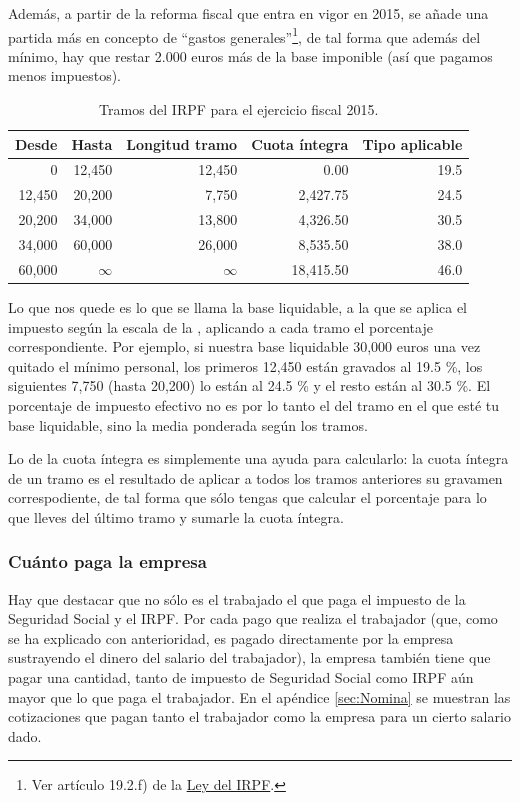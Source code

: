 \documentclass[nochap,palatino,shortheader]{apuntes}
\begin{document}
Además, a partir de la reforma fiscal que entra en vigor en 2015, se añade una partida más en concepto de ``gastos generales''\footnote{Ver artículo 19.2.f) de la \href{https://www.boe.es/buscar/act.php?id=BOE-A-2006-20764&b=29&tn=1&p=20141128}{Ley del IRPF}.}, de tal forma que además del mínimo, hay que restar 2.000 euros más de la base imponible (así que pagamos menos impuestos).

\begin{table}[hbtp]
\centering
\footnotesize
\begin{tabular}{r|r|r|r|r}
\textbf{Desde} & \textbf{Hasta} & \textbf{Longitud tramo} & \textbf{Cuota íntegra} & \textbf{Tipo aplicable} \\ \toprule
0 & 12,450 & 12,450 & 0.00 & 19.5 \\
12,450 & 20,200 & 7,750 & 2,427.75 & 24.5 \\
20,200 & 34,000 & 13,800 & 4,326.50 & 30.5 \\
34,000 & 60,000 & 26,000 & 8,535.50 & 38.0 \\
60,000 & $\infty$ & $\infty$ & 18,415.50 & 46.0 \\
\end{tabular}
\caption{Tramos del IRPF para el ejercicio fiscal 2015.}
\label{tab:Tramos2015IRPF}
\end{table}

Lo que nos quede es lo que se llama la base liquidable, a la que se aplica el impuesto según la escala de la , aplicando a cada tramo el porcentaje correspondiente. Por ejemplo, si nuestra base liquidable 30,000 euros una vez quitado el mínimo personal, los primeros 12,450 están gravados al 19.5 \%, los siguientes 7,750 (hasta 20,200) lo están al 24.5 \% y el resto están al 30.5 \%. El porcentaje de impuesto efectivo no es por lo tanto el del tramo en el que esté tu base liquidable, sino la media ponderada según los tramos.

Lo de la cuota íntegra es simplemente una ayuda para calcularlo: la cuota íntegra de un tramo es el resultado de aplicar a todos los tramos anteriores su gravamen correspodiente, de tal forma que sólo tengas que calcular el porcentaje para lo que lleves del último tramo y sumarle la cuota íntegra.

\subsubsection{Cuánto paga la empresa}
Hay que destacar que no sólo es el trabajado el que paga el impuesto de la Seguridad Social y el IRPF. Por cada pago que realiza el trabajador (que, como se ha explicado con anterioridad, es pagado directamente por la empresa sustrayendo el dinero del salario del trabajador), la empresa también tiene que pagar una cantidad, tanto de impuesto de Seguridad Social como IRPF aún mayor que lo que paga el trabajador. En el apéndice \ref{sec:Nomina} se muestran las cotizaciones que pagan tanto el trabajador como la empresa para un cierto salario dado.
\end{document}

